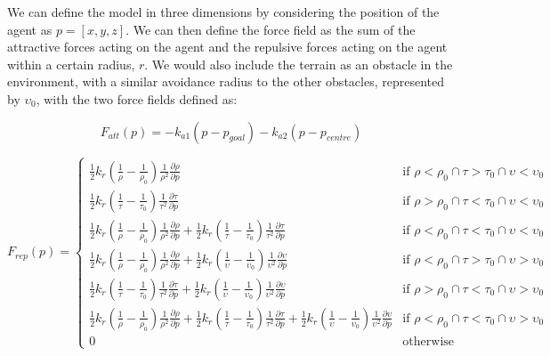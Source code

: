 \documentclass[12pt]{article}
\begin{document}
We can define the model in three dimensions by considering the position of the agent as $p = [x,y,z]$. We can then define the force field as the sum of the attractive forces acting on the agent and the repulsive forces acting on the agent within a certain radius, $r$. We would also include the terrain as an obstacle in the environment, with a similar avoidance radius to the other obstacles, represented by $\upsilon_0$, with the two force fields defined as:

\begin{equation}
    F_{att}(p) = -k_{a1}(p-p_{goal}) - k_{a2}(p-p_{centre})
\end{equation}

\begin{equation}
    F_{rep}(p) = 
    \begin{cases}
        \frac{1}{2}k_r(\frac{1}{\rho}-\frac{1}{\rho_{0}})\frac{1}{\rho^2}\frac{\partial \rho}{\partial p} & \text{if } \rho < \rho_{0} \cap \tau > \tau_{0} \cap \upsilon < \upsilon_{0}\\
        \frac{1}{2}k_r(\frac{1}{\tau}-\frac{1}{\tau_{0}})\frac{1}{\tau^2}\frac{\partial \tau}{\partial p} & \text{if } \rho > \rho_{0} \cap \tau < \tau_{0} \cap \upsilon < \upsilon_{0}\\
        \frac{1}{2}k_r(\frac{1}{\rho}-\frac{1}{\rho_{0}})\frac{1}{\rho^2}\frac{\partial \rho}{\partial p} + \frac{1}{2}k_r(\frac{1}{\tau}-\frac{1}{\tau_{0}})\frac{1}{\tau^2}\frac{\partial \tau}{\partial p} & \text{if } \rho < \rho_{0} \cap \tau < \tau_{0} \cap \upsilon < \upsilon_{0}\\
        \frac{1}{2}k_r(\frac{1}{\rho}-\frac{1}{\rho_{0}})\frac{1}{\rho^2}\frac{\partial \rho}{\partial p} + \frac{1}{2}k_r(\frac{1}{\upsilon}-\frac{1}{\upsilon_{0}})\frac{1}{\upsilon^2}\frac{\partial \upsilon}{\partial p} & \text{if } \rho < \rho_{0} \cap \tau > \tau_{0} \cap \upsilon > \upsilon_{0}\\
        \frac{1}{2}k_r(\frac{1}{\tau}-\frac{1}{\tau_{0}})\frac{1}{\tau^2}\frac{\partial \tau}{\partial p} + \frac{1}{2}k_r(\frac{1}{\upsilon}-\frac{1}{\upsilon_{0}})\frac{1}{\upsilon^2}\frac{\partial \upsilon}{\partial p} & \text{if } \rho > \rho_{0} \cap \tau < \tau_{0} \cap \upsilon > \upsilon_{0}\\
        \frac{1}{2}k_r(\frac{1}{\rho}-\frac{1}{\rho_{0}})\frac{1}{\rho^2}\frac{\partial \rho}{\partial p} + \frac{1}{2}k_r(\frac{1}{\tau}-\frac{1}{\tau_{0}})\frac{1}{\tau^2}\frac{\partial \tau}{\partial p} + \frac{1}{2}k_r(\frac{1}{\upsilon}-\frac{1}{\upsilon_{0}})\frac{1}{\upsilon^2}\frac{\partial \upsilon}{\partial p} & \text{if } \rho < \rho_{0} \cap \tau < \tau_{0} \cap \upsilon > \upsilon_{0}\\
        0 & \text{otherwise}
    \end{cases}
\end{equation}
\end{document}
